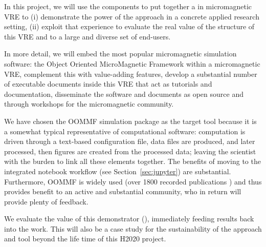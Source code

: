 In this project, we will use the \TheProject components to put
together a in micromagnetic VRE to (i) demonstrate the power of the
approach in a concrete applied research setting, (ii) exploit that
experience to evaluate the real value of the structure of this VRE and
\TheProject to a large and diverse set of end-users.

In more detail, we will embed the most popular micromagnetic
simulation software: the Object Oriented MicroMagnetic Framework
\cite{OOMMF-url} within a micromagnetic VRE, complement this with
value-adding features, develop a substantial number of executable
documents inside this VRE that act as tutorials and documentation,
disseminate the software and documents as open source and through
workshops for the micromagnetic community.  

We have chosen the OOMMF simulation package as the target tool because
it is a somewhat typical representative of computational software:
computation is driven through a text-based configuration file, data
files are produced, and later processed, then figures are created from
the processed data; leaving the scientist with the burden to link all
these elements together. The benefits of moving to the integrated
notebook workflow (see Section~\ref{sec:jupyter}) are
substantial. Furthermore, OOMMF is widely used (over 1800 recorded
publications \cite{OOMMF-citations-url}) and thus provides benefit to
an active and substantial community, who in return will provide plenty
of feedback.

We evaluate the value of this demonstrator
(), immediately feeding
results back into the \TheProject work. This will also
be a case study for the sustainability of the approach and tool beyond
the life time of this H2020 project.


